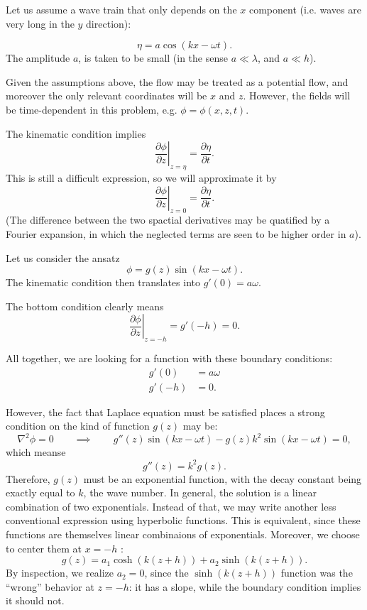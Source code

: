 Let us assume a wave train that only depends on the $x$ component
(i.e. waves are very long in the $y$ direction):

\begin{equation}
  \label{eq:wave_on_x}
  \eta = a \cos(kx -\omega t) .
\end{equation}
%
The amplitude $a$, is taken to be small (in the sense $a\ll \lambda$,
and $a\ll h$).

Given the assumptions above, the flow may be treated as a potential
flow, and moreover the only relevant coordinates will be $x$ and
$z$. However, the fields will be time-dependent in this problem,
e.g. $\phi=\phi(x,z,t)$.


The kinematic condition  implies
\[
\left. \frac{\partial \phi}{\partial z}\right|_{z=\eta} =
\frac{\partial \eta}{\partial t} .
\]
This is still a difficult expression, so we will approximate it by
\[
\left. \frac{\partial \phi}{\partial z}\right|_{z=0} =
\frac{\partial \eta}{\partial t} .
\]
(The difference between the two spactial derivatives may be quatified
by a Fourier expansion, in which the neglected terms are seen to be
higher order in $a$).

Let us consider the ansatz
\[
\phi = g(z) \sin(kx -\omega t ) .
\]
The kinematic condition then translates into $g'(0)=a\omega$.

The bottom condition clearly means
\[
\left. \frac{\partial \phi}{\partial z}\right|_{z= -h } = g'(-h)= 0 .
\]


All together, we are looking for a function with these boundary
conditions:
\begin{align}
  g'(0) &=  a \omega \\
  g'(-h) &= 0 .
\end{align}

However, the fact that Laplace equation must be satisfied places a
strong condition on the kind of function $g(z)$ may be:
\[
\nabla^2 \phi = 0 \qquad \implies \qquad
g''(z)  \sin(kx -\omega t ) - g(z)  k^2 \sin(kx -\omega t ) = 0 ,
\]
which meanse
\[
g''(z)  = k^2 g(z) .
\]
Therefore, $g(z)$ must be an exponential function, with the decay
constant being exactly equal to $k$, the wave number. In general, the
solution is a linear combination of two exponentials. Instead of that,
we may write another less conventional expression using hyperbolic
functions. This is equivalent, since these functions are themselves
linear combinaions of exponentials. Moreover, we choose to center them
at $x=-h$ :
\[
g(z)  = a_1 \cosh(k(z+h)) + a_2 \sinh(k(z+h)) .
\]
By inspection, we realize $a_2=0$, since the $\sinh(k(z+h))$ function
was the ``wrong'' behavior at $z=-h$: it has a slope, while the
boundary condition implies it should not.

